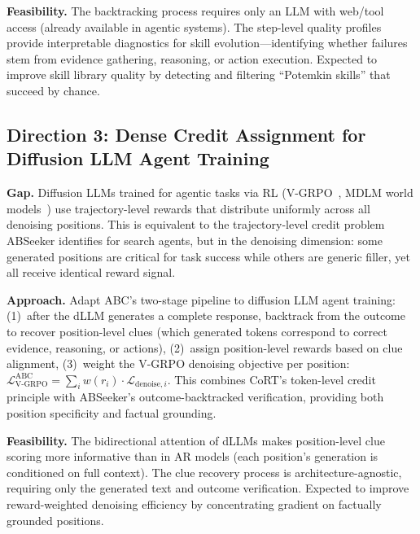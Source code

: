 \documentclass[11pt,a4paper]{article}
\begin{document}
\textbf{Feasibility.} The backtracking process requires only an LLM with web/tool access (already available in agentic systems). The step-level quality profiles provide interpretable diagnostics for skill evolution---identifying whether failures stem from evidence gathering, reasoning, or action execution. Expected to improve skill library quality by detecting and filtering ``Potemkin skills'' that succeed by chance.

\subsection{Direction 3: Dense Credit Assignment for Diffusion LLM Agent Training}

\textbf{Gap.} Diffusion LLMs trained for agentic tasks via RL (V-GRPO~\cite{vgrpo2026}, MDLM world models~\cite{mdlmwm2026}) use trajectory-level rewards that distribute uniformly across all denoising positions. This is equivalent to the trajectory-level credit problem ABSeeker identifies for search agents, but in the denoising dimension: some generated positions are critical for task success while others are generic filler, yet all receive identical reward signal.

\textbf{Approach.} Adapt ABC's two-stage pipeline to diffusion LLM agent training: (1)~after the dLLM generates a complete response, backtrack from the outcome to recover position-level clues (which generated tokens correspond to correct evidence, reasoning, or actions), (2)~assign position-level rewards based on clue alignment, (3)~weight the V-GRPO denoising objective per position: $\mathcal{L}_{\text{V-GRPO}}^{\text{ABC}} = \sum_i w(r_i) \cdot \mathcal{L}_{\text{denoise},i}$. This combines CoRT's token-level credit principle with ABSeeker's outcome-backtracked verification, providing both position specificity and factual grounding.

\textbf{Feasibility.} The bidirectional attention of dLLMs makes position-level clue scoring more informative than in AR models (each position's generation is conditioned on full context). The clue recovery process is architecture-agnostic, requiring only the generated text and outcome verification. Expected to improve reward-weighted denoising efficiency by concentrating gradient on factually grounded positions.
\end{document}

